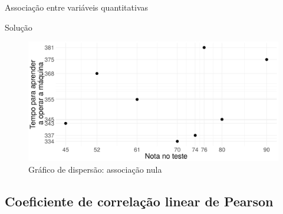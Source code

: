 \documentclass[9pt]{beamer}
\begin{document}
\begin{frame}{Associação entre variáveis quantitativas}

\begin{block}{Solução}
	\begin{figure}[htbp]
		\centering
		\includegraphics[width = \linewidth]{figures/nula.png}
		\caption{Gráfico de dispersão: associação nula}
		\label{tab:associacao-nula}
	\end{figure}		
\end{block}

\end{frame}


\subsection{Coeficiente de correlação linear de Pearson}
\end{document}
